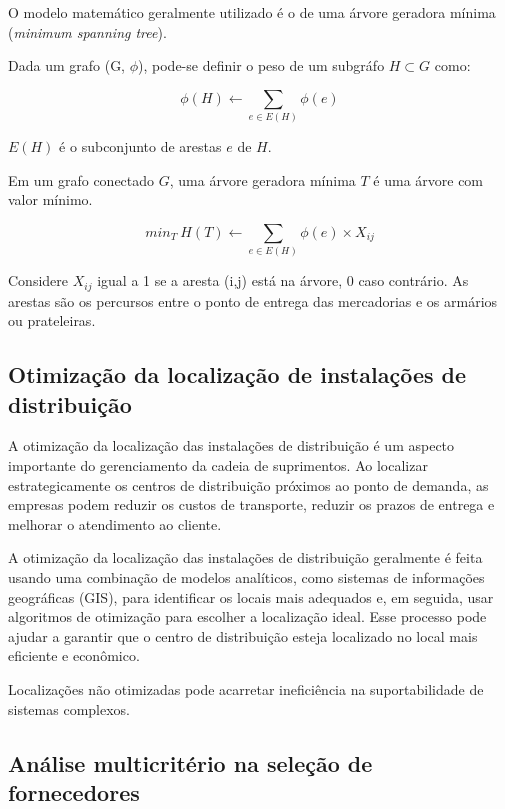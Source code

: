 \documentclass{article}
\begin{document}
O modelo matemático geralmente utilizado é o de uma árvore geradora mínima ({\it minimum spanning tree}).

Dada um grafo (G, $\phi$), pode-se definir o peso de um subgráfo $H \subset G$ como:

\begin{equation} \label{eq:fo1}
	\phi(H) \gets \sum_{e \in E(H)} \phi (e)
\end{equation}

$E(H)$ é o subconjunto de arestas $e$ de $H$.

Em um grafo conectado $G$, uma árvore geradora mínima $T$ é uma árvore com valor mínimo.

\begin{equation} \label{eq:fo2}
	min_T\ H(T) \gets \sum_{e \in E(H)} \phi (e) \times X_{ij}
\end{equation}


Considere $X_{ij}$ igual a 1 se a aresta (i,j) está na árvore, 0 caso contrário. As arestas são os percursos entre o ponto de entrega das mercadorias e os armários ou prateleiras.


\subsection{Otimização da localização de instalações de distribuição}

A otimização da localização das instalações de distribuição é um aspecto importante do gerenciamento da cadeia de suprimentos. Ao localizar estrategicamente os centros de distribuição próximos ao ponto de demanda, as empresas podem reduzir os custos de transporte, reduzir os prazos de entrega e melhorar o atendimento ao cliente.

A otimização da localização das instalações de distribuição geralmente é feita usando uma combinação de modelos analíticos, como sistemas de informações geográficas (GIS), para identificar os locais mais adequados e, em seguida, usar algoritmos de otimização para escolher a localização ideal. Esse processo pode ajudar a garantir que o centro de distribuição esteja localizado no local mais eficiente e econômico.

Localizações não otimizadas pode acarretar ineficiência na suportabilidade de sistemas complexos.

\subsection{Análise multicritério na seleção de fornecedores}
\end{document}

